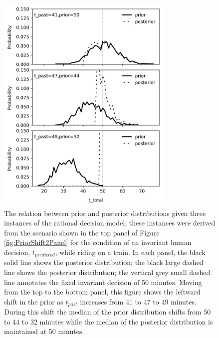 \begin{figure}
    \centering
    \includegraphics[width=0.75\textwidth]{Figures/Theory_PriorShift_1.png}
    \caption{The relation between prior and posterior distributions given three instances of the rational decision model; these instances were derived from the scenario shown in the top panel of Figure \ref{fig:PriorShift2Panel} for the condition of an invariant human decision, $t_{predicted}$, while riding on a train.  In each panel, the black solid line shows the posterior distribution; the black large dashed line shows the posterior distribution; the vertical grey small dashed line annotates the fixed invariant decision of 50 minutes.  Moving from the top to the bottom panel, this figure shows the leftward shift in the prior as $t_{past}$ increases from 41 to 47 to 49 minutes.  During this shift the median of the prior distribution shifts from 50 to 44 to 32 minutes while the median of the posterior distribution is maintained at 50 minutes.
    }
    \label{fig:PriorShift1}
\end{figure}

